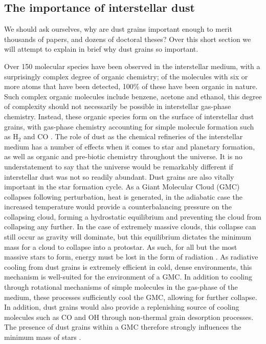 \subsection{The importance of interstellar dust}
\label{sec:dustimportance}

We should ask ourselves, why are dust grains important enough to merit thousands of papers, and dozens of doctoral theses?
Over this short section we will attempt to explain in brief why dust grains so important.


Over 150 molecular species have been observed in the interstellar medium, with a surprisingly complex degree of organic chemistry; of the molecules with six or more atoms that have been detected, 100\% of these have been organic in nature.
Such complex organic molecules include benzene, acetone and ethanol, this degree of complexity should not necessarily be possible in interstellar gas-phase chemistry.
Instead, these organic species form on the surface of interstellar dust grains, with gas-phase chemistry accounting for simple molecule formation such as $\text{H}_2$ and $\text{CO}$
\parencite{herbstComplexOrganicInterstellar2009}.
The role of dust as the chemical refineries of the interstellar medium has a number of effects when it comes to star and planetary formation, as well as organic and pre-biotic chemistry throughout the universe.
It is no understatement to say that the universe would be remarkably different if interstellar dust was not so readily abundant.
Dust grains are also vitally important in the star formation cycle.
As a Giant Molecular Cloud (GMC) collapses following perturbation, heat is generated, in the adiabatic case the increased temperature would provide a counterbalancing pressure on the collapsing cloud, forming a hydrostatic equilibrium and preventing the cloud from collapsing any further.
In the case of extremely massive clouds, this collapse can still occur as gravity will dominate, but this equilibrium dictates the minimum mass for a cloud to collapse into a protostar.
As such, for all but the most massive stars to form, energy must be lost in the form of radiation
\parencite{ward-thompsonIntroductionStarFormation2011}.
As radiative cooling from dust grains is extremely efficient in cold, dense environments, this mechanism is well-suited for the environment of a GMC.
In addition to cooling through rotational mechanisms of simple molecules in the gas-phase of the medium, these processes sufficiently cool the GMC, allowing for further collapse.
In addition, dust grains would also provide a replenishing source of cooling molecules such as CO and OH through non-thermal grain desorption processes.
The presence of dust grains within a GMC therefore strongly influences the minimum mass of stars
\parencite{williamsChemistryCosmicDust2015}.

